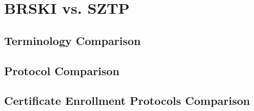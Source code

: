\chapter{BRSKI vs. SZTP}\label{appendix-A}
\section{Terminology Comparison}

\begin{landscape}
\section{Protocol Comparison}

\end{landscape}
\begin{landscape}
\chapter{Certificate Enrollment Protocols Comparison}\label{appendix-enrollment}

\end{landscape}
